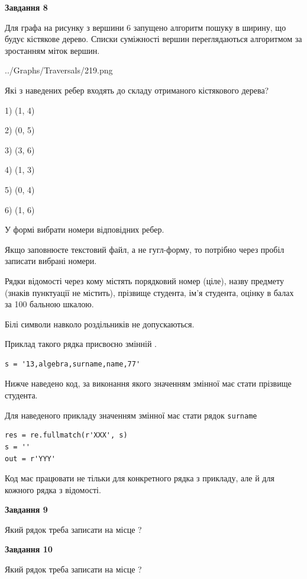 \documentclass[12pt, ukrainian]{article}
\def\code#1{\Verb!#1!}
\begin{document}
{\begin {large}
{\begin {center}\textbf{Завдання 8}\end {center}}\par
Для графа на рисунку з вершини 6 запущено алгоритм пошуку в ширину, що будує кістякове дерево. Списки суміжності вершин переглядаються алгоритмом за зростанням міток вершин.\par
\begin{center}
	{../Graphs/Traversals/219.png}
\end{center}
\par Які з наведених ребер входять до складу отриманого кістякового дерева?\par
1) (1, 4)\par
2) (0, 5)\par
3) (3, 6)\par
4) (1, 3)\par
5) (0, 4)\par
6) (1, 6)\par
{\vskip 15pt} У формі вибрати номери відповідних ребер.


Якщо заповнюєте текстовий файл, а не гугл-форму, то потрібно через пробіл записа\-ти вибрані номери.\par
\newpage


Рядки відомості через кому містять порядковий номер (ціле), назву предмету (зна\-ків пунктуації не містить), прізвище студента, ім'я студента, оцінку в балах за 100 бальною шкалою.

Білі символи навколо роздільників не допускаються.

Приклад такого рядка присвоєно змінній .



\begin{verbatim}
s = '13,algebra,surname,name,77'
\end{verbatim}


Нижче наведено код, за виконання якого значенням змінної  має стати прізвище студента.

Для наведеного прикладу значенням змінної  має стати рядок \code{surname}



\begin{verbatim}
res = re.fullmatch(r'XXX', s)
s = ''
out = r'YYY'
\end{verbatim}


Код має працювати не тільки для конкретного рядка з прикладу, але й для кожного рядка з відомості.

{\begin {center}\textbf{Завдання 9}\end {center}}\par
Який рядок треба записати на місце  ?\par
\vspace{5mm}


{\begin {center}\textbf{Завдання 10}\end {center}}\par
Який рядок треба записати на місце  ?\par


\newpage


\end {large}}
\end{document}
